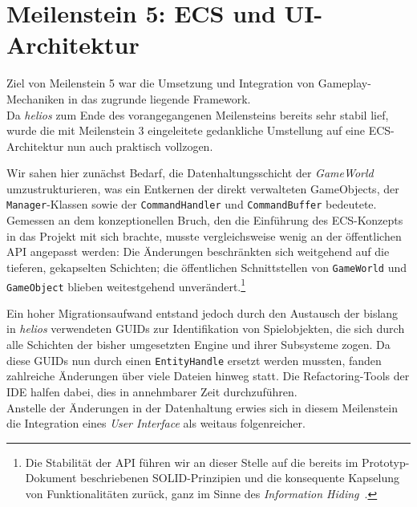 \section{Meilenstein 5: ECS und UI-Architektur}\label{sec:meilenstein_5}

Ziel von Meilenstein 5 war die Umsetzung und Integration von Gameplay-Mechaniken in das zugrunde liegende Framework.\\

Da \textit{helios} zum Ende des vorangegangenen Meilensteins bereits sehr stabil lief, wurde die mit Meilenstein 3 eingeleitete gedankliche Umstellung auf eine ECS-Architektur nun auch praktisch vollzogen.

Wir sahen hier zunächst Bedarf, die Datenhaltungsschicht der \textit{GameWorld} umzustrukturieren, was ein Entkernen der direkt verwalteten GameObjects, der \texttt{Manager}-Klassen sowie der \texttt{CommandHandler} und \texttt{CommandBuffer} bedeutete.
Gemessen an dem konzeptionellen Bruch, den die Einführung des ECS-Konzepts in das Projekt mit sich brachte, musste vergleichsweise wenig an der öffentlichen API angepasst werden:
Die Änderungen beschränkten sich weitgehend auf die tieferen, gekapselten Schichten; die öffentlichen Schnittstellen von \texttt{GameWorld} und \texttt{GameObject} blieben weitestgehend unverändert.\footnote{
    Die Stabilität der API führen wir an dieser Stelle auf die bereits im Prototyp-Dokument beschriebenen SOLID-Prinzipien und die konsequente Kapselung von Funktionalitäten zurück, ganz im Sinne des \textit{Information Hiding}~\cite{Par72}.
}

Ein hoher Migrationsaufwand entstand jedoch durch den Austausch der bislang in \textit{helios} verwendeten GUIDs zur Identifikation von Spielobjekten, die sich durch alle Schichten der bisher umgesetzten Engine und ihrer Subsysteme zogen.
Da diese GUIDs nun durch einen \texttt{EntityHandle} ersetzt werden mussten, fanden zahlreiche Änderungen über viele Dateien hinweg statt.
Die Refactoring-Tools der IDE halfen dabei, dies in annehmbarer Zeit durchzuführen.\\

Anstelle der Änderungen in der Datenhaltung erwies sich in diesem Meilenstein die Integration eines \textit{User Interface} als weitaus folgenreicher.

